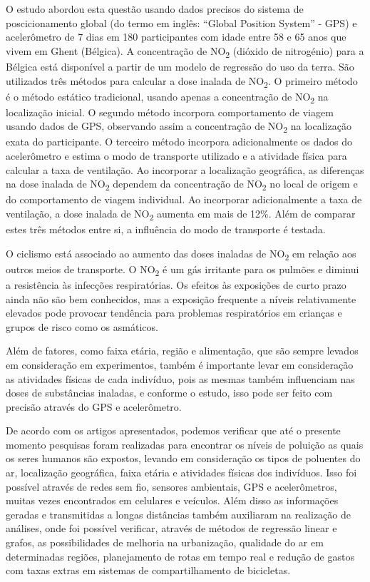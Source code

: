 O estudo abordou esta questão usando dados precisos do sistema de poscicionamento global (do termo 
em inglês: ``Global Position System'' -  GPS) e acelerômetro de 7 dias em 180 participantes com idade 
entre 58 e 65 anos que vivem em Ghent (Bélgica). A concentração de NO\textsubscript{2} (dióxido de 
nitrogénio) para a Bélgica está disponível a partir de um modelo de regressão do uso da terra. São 
utilizados três métodos para calcular a dose inalada de NO\textsubscript{2}. O primeiro método é o 
método estático tradicional, usando apenas a concentração de NO\textsubscript{2} na localização 
inicial. O segundo método incorpora comportamento de viagem usando dados de GPS, observando assim a 
concentração de NO\textsubscript{2} na localização exata do participante. O terceiro método incorpora 
adicionalmente os dados do acelerômetro e estima o modo de transporte utilizado e a atividade física 
para calcular a taxa de ventilação. Ao incorporar a localização geográfica, as diferenças na dose 
inalada de NO\textsubscript{2} dependem da concentração de NO\textsubscript{2} no local de origem e 
do comportamento de viagem individual. Ao incorporar adicionalmente a taxa de ventilação, a dose 
inalada de NO\textsubscript{2} aumenta em mais de 12\%. Além de comparar estes três métodos entre si, 
a influência do modo de transporte é testada. 

O ciclismo está associado ao aumento das doses inaladas de NO\textsubscript{2} em relação aos outros 
meios de transporte. O NO\textsubscript{2} é um gás irritante para os pulmões e diminui a resistência 
às infecções respiratórias. Os efeitos às exposições de curto prazo ainda não são bem conhecidos, 
mas a exposição frequente a níveis relativamente elevados pode provocar tendência para problemas 
respiratórios em crianças e grupos de risco como os asmáticos.

Além de fatores, como faixa etária, região e alimentação, que são sempre levados em consideração em 
experimentos, também é importante levar em consideração as atividades físicas de cada indivíduo, pois 
as mesmas também influenciam nas doses de substâncias inaladas, e conforme o estudo, isso pode ser 
feito com precisão através do GPS e acelerômetro.

De acordo com os artigos apresentados, podemos verificar que até o presente momento pesquisas foram 
realizadas para encontrar os níveis de poluição as quais os seres humanos são expostos, levando em 
consideração os tipos de poluentes do ar, localização geográfica, faixa etária e atividades físicas 
dos indivíduos. Isso foi possível através de redes sem fio, sensores ambientais, GPS e acelerômetros, 
muitas vezes encontrados em celulares e veículos. Além disso as informações geradas e transmitidas a 
longas distâncias também auxiliaram na realização de análises, onde foi possível verificar, através 
de métodos de regressão linear e grafos, as possibilidades de melhoria na urbanização, qualidade do 
ar em determinadas regiões, planejamento de rotas em tempo real e redução de gastos com taxas extras 
em sistemas de compartilhamento de bicicletas.
